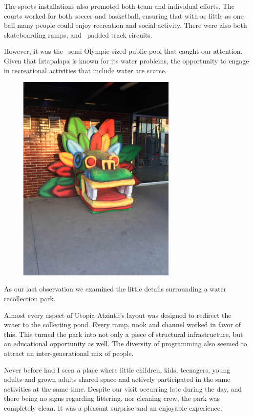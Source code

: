 \documentclass[letter]{ourGreenwayBrand}
\begin{document}
The sports installations also promoted both team and individual efforts. The courts worked for both soccer and basketball, ensuring that with as little as one ball many people could enjoy recreation and social activity. There were also both skateboarding ramps, and  padded track circuits.

However, it was the  semi Olympic sized public pool that caught our attention. Given that Iztapalapa is known for its water problems, the opportunity to engage in recreational activities that include water are scarce.

\begin{figure}[htbp]
  \centering
  \includegraphics[width=0.7\textwidth]{images/IMG_8064-scaled.jpg}
\end{figure}

As our last observation we examined the little details surrounding a water recollection park.

Almost every aspect of Utopia Atzintli’s layout was designed to redirect the water to the collecting pond. Every ramp, nook and channel worked in favor of this. This turned the park into not only a piece of structural infrastructure, but an educational opportunity as well. The diversity of programming also seemed to attract an inter-generational mix of people.

Never before had I seen a place where little children, kids, teenagers, young adults and grown adults shared space and actively participated in the same activities at the same time. Despite our visit occurring late during the day, and there being no signs regarding littering, nor cleaning crew, the park was completely clean. It was a pleasant surprise and an enjoyable experience.
\end{document}
